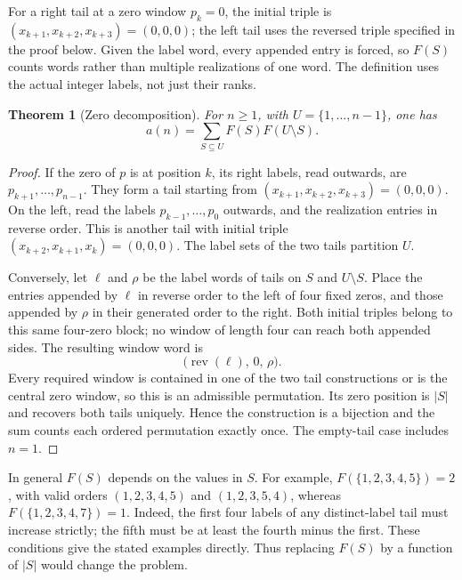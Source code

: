 \documentclass[11pt]{article}
\newtheorem{theorem}{Theorem}[section]
\theoremstyle{definition}
\theoremstyle{remark}
\begin{document}
For a right tail at a zero window $p_k=0$, the initial triple is
$(x_{k+1},x_{k+2},x_{k+3})=(0,0,0)$; the left tail uses the reversed triple
specified in the proof below. Given the label word, every appended entry is forced,
so $F(S)$ counts words rather than multiple realizations of one word.
The definition uses the actual integer labels, not just their ranks.

\begin{theorem}[Zero decomposition]
\label{thm:convolution}
For $n\geq1$, with $U=\{1,\ldots,n-1\}$, one has
\begin{equation}
 a(n)=\sum_{S\subseteq U}F(S)F(U\setminus S).
 \label{eq:convolution}
\end{equation}
\end{theorem}
\begin{proof}
If the zero of $p$ is at position $k$, its right labels, read outwards,
are $p_{k+1},\ldots,p_{n-1}$. They form a tail starting from
$(x_{k+1},x_{k+2},x_{k+3})=(0,0,0)$. On the left, read the labels
$p_{k-1},\ldots,p_0$ outwards, and the realization entries in reverse
order. This is another tail with initial triple
$(x_{k+2},x_{k+1},x_k)=(0,0,0)$. The label sets of the two tails partition $U$.

Conversely, let $\ell$ and $\rho$ be the label words of tails on $S$ and
$U\setminus S$. Place the entries appended by $\ell$ in reverse order to
the left of four fixed zeros, and those appended by $\rho$ in their generated
order to the right. Both initial triples belong to this same four-zero
block; no window of length four can reach both appended sides.
The resulting window word is
\[
 \bigl(\operatorname{rev}(\ell),\,0,\,\rho\bigr).
\]
Every required window is contained in one of the two tail constructions or
is the central zero window, so this is an admissible permutation. Its zero
position is $|S|$ and recovers both tails uniquely. Hence the construction is
a bijection and the sum counts each ordered permutation exactly once.
The empty-tail case includes $n=1$.
\end{proof}

In general $F(S)$ depends on the values in $S$. For example,
$F(\{1,2,3,4,5\})=2$, with valid orders $(1,2,3,4,5)$ and $(1,2,3,5,4)$,
whereas $F(\{1,2,3,4,7\})=1$. Indeed, the first four labels of any
distinct-label tail must increase strictly; the fifth must be at least the
fourth minus the first. These conditions give the stated examples directly.
Thus replacing $F(S)$ by a function of $|S|$ would change the problem.
\end{document}
